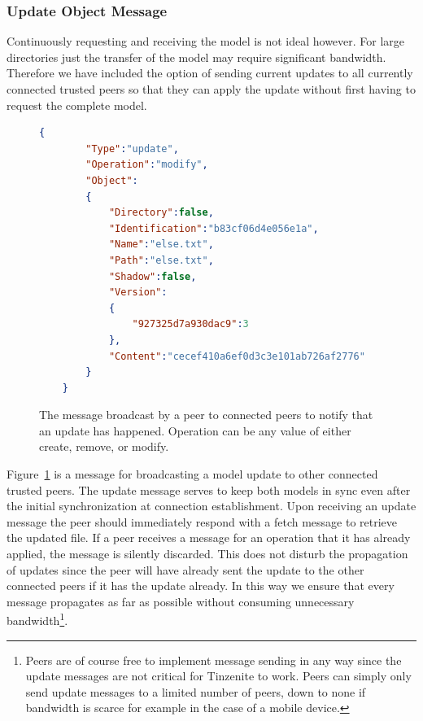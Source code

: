 \subsubsection{Update Object Message}
\label{subs:Update Object Message}

Continuously requesting and receiving the model is not ideal however.
For large directories just the transfer of the model may require significant bandwidth.
Therefore we have included the option of sending current updates to all currently connected trusted peers so that they can apply the update without first having to request the complete model.

\begin{figure}[htp]
    \begin{lstlisting}[language=json,firstnumber=0]
    {
        "Type":"update",
        "Operation":"modify",
        "Object":
        {
            "Directory":false,
            "Identification":"b83cf06d4e056e1a",
            "Name":"else.txt",
            "Path":"else.txt",
            "Shadow":false,
            "Version":
            {
                "927325d7a930dac9":3
            },
            "Content":"cecef410a6ef0d3c3e101ab726af2776"
        }
    }
    \end{lstlisting}
\caption[Update Object Message]{The message broadcast by a peer to connected peers to notify that an update has happened. Operation can be any value of either create, remove, or modify.}
\label{json:update_object}
\end{figure}

Figure~\ref{json:update_object} is a message for broadcasting a model update to other connected trusted peers.
The update message serves to keep both models in sync even after the initial synchronization at connection establishment.
Upon receiving an update message the peer should immediately respond with a fetch message to retrieve the updated file.
If a peer receives a message for an operation that it has already applied, the message is silently discarded.
This does not disturb the propagation of updates since the peer will have already sent the update to the other connected peers if it has the update already.
In this way we ensure that every message propagates as far as possible without consuming unnecessary bandwidth\footnote{Peers are of course free to implement message sending in any way since the update messages are not critical for Tinzenite to work. Peers can simply only send update messages to a limited number of peers, down to none if bandwidth is scarce for example in the case of a mobile device.}.

